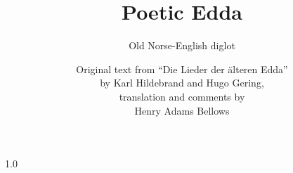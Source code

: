 \documentclass{scrbook}
\newcommand{\tocnumwidth}{5em}
\newcommand{\tocspacing}{1.0} %
\newcommand{\tocmarginwidth}{2.55em} %
\newcommand{\titlesize}{48pt}
\newcommand{\tocnumwidth}{5em}
\newcommand{\tocspacing}{0.9} %
\newcommand{\tocmarginwidth}{2.55em} %
\newcommand{\tocnumwidth}{5em}
\newcommand{\tocspacing}{0.9}
\newcommand{\tocmarginwidth}{2.55em} %
\begin{document}
\title{\fontsize{\titlesize}{\titlesize}\selectfont Poetic Edda}
\subtitle{\Large{Old Norse-English diglot}}
\author{
Original text from ``Die Lieder der älteren Edda'' \\
by Karl Hildebrand and Hugo Gering, \\
translation and comments by \\
Henry Adams Bellows
}

\date{}
\publishers{\small{Typeset by Bogdan Opanchuk, \\ compiled on \today \\ Melbourne, Australia}}

\maketitle

\frontmatter

\clearpage
\begingroup

	\pagestyle{empty}
	\renewcommand*{\chapterpagestyle}{empty}

	\renewcommand{\@pnumwidth}{\tocnumwidth}
	\renewcommand{\@tocrmarg}{\tocmarginwidth plus1fil} %

	\begin{spacing}{\tocspacing}
	\tableofcontents
	\end{spacing}

\clearpage
\endgroup

\mainmatter




%
%
\end{document}
